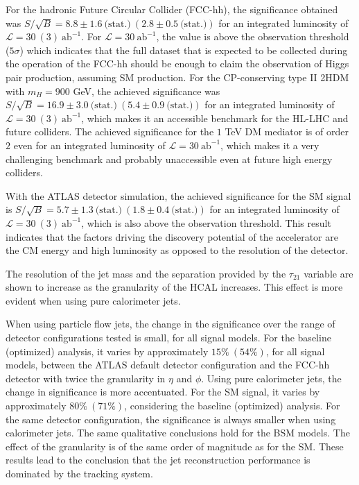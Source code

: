 For the hadronic Future Circular Collider (FCC-hh), the significance obtained was $S/\sqrt{B}= 8.8\pm 1.6~\text{(stat.)}~(2.8\pm0.5~\text{(stat.)})$ for an integrated luminosity of $\mathcal{L}=30~(3)~\text{ab}^{-1}$. For $\mathcal{L}=30~\text{ab}^{-1}$, the value is above the observation threshold ($5\sigma$) which indicates that the full dataset that is expected to be collected during the operation of the FCC-hh should be enough to claim the observation of Higgs pair production, assuming SM production. For the CP-conserving type II 2HDM with $m_H=900$ GeV, the achieved significance was $S/\sqrt{B}=16.9\pm 3.0~\text{(stat.)} ~(5.4\pm0.9~\text{(stat.)})$ for an integrated luminosity of $\mathcal{L}=30~(3)~\text{ab}^{-1}$, which makes it an accessible benchmark for the HL-LHC and future colliders. The achieved significance for the $1$ TeV DM mediator is of order $2$ even for an integrated luminosity of $\mathcal{L}=30~\text{ab}^{-1}$, which makes it a very challenging benchmark and probably unaccessible even at future high energy colliders. 

With the ATLAS detector simulation, the achieved significance for the SM signal is $S/\sqrt{B}=5.7\pm 1.3~\text{(stat.)} ~(1.8\pm 0.4~\text{(stat.)})$ for an integrated luminosity of $\mathcal{L}=30~(3)~\text{ab}^{-1}$, which is also above the observation threshold. This result indicates that the factors driving the discovery potential of the accelerator are the CM energy and high luminosity as opposed to the resolution of the detector.

The resolution of the jet mass and the separation provided by the $\tau_{21}$ variable are shown to increase as the granularity of the HCAL increases. This effect is more evident when using pure calorimeter jets. 

When using particle flow jets, the change in the significance over the range of detector configurations tested is small, for all signal models. For the baseline (optimized) analysis, it varies by approximately $15\%~(54\%)$, for all signal models, between the ATLAS default detector configuration and the FCC-hh detector with twice the granularity in $\eta$ and $\phi$. Using pure calorimeter jets, the change in significance is more accentuated. For the SM signal, it varies by approximately $80\%~(71\%)$, considering the baseline (optimized) analysis. For the same detector configuration, the significance is always smaller when using calorimeter jets. The same qualitative conclusions hold for the BSM models. The effect of the granularity is of the same order of magnitude as for the SM.
These results lead to the conclusion that the jet reconstruction performance is dominated by the tracking system. 

